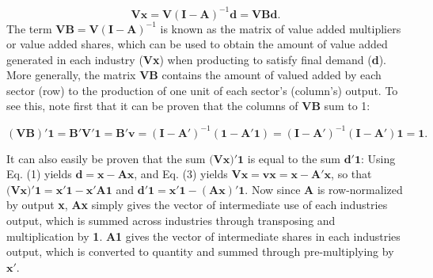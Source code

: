 \documentclass[a4paper]{article}
\begin{document}
\begin{equation} \label{eq:VB}
\textbf{V}\textbf{x} = \textbf{V}(\textbf{I}-\textbf{A})^{-1} \textbf{d} = \textbf{VBd}.
\end{equation}
The term $\textbf{VB} = \textbf{V}(\textbf{I}-\textbf{A})^{-1}$ is known as the matrix of value added multipliers or value added shares, which can be used to obtain the amount of value added generated in each industry (\textbf{Vx}) when producting to satisfy final demand (\textbf{d}). More generally, the matrix $\textbf{VB}$ contains the amount of valued added by each sector (row) to the production of one unit of each sector's (column's) output.  To see this, note first that it can be proven that the columns of \textbf{VB} sum to 1:

\begin{equation} \label{eq:VBproof}
(\textbf{VB})'\textbf{1} = \textbf{B}'\textbf{V}'\textbf{1} =  \textbf{B}'\textbf{v}  = (\textbf{I}-\textbf{A}')^{-1}  (\textbf{1}-\textbf{A}'\textbf{1}) = (\textbf{I}-\textbf{A}')^{-1}  (\textbf{I}-\textbf{A}')\textbf{1} = \textbf{1}.
\end{equation}



It can also easily be proven that the sum $\textbf{(Vx)}'\textbf{1}$ is equal to the sum $\textbf{d}'\textbf{1}$: Using Eq. (1) yields $\textbf{d} = \textbf{x} - \textbf{Ax}$, and Eq. (3) yields $\textbf{Vx} = \textbf{vx} = \textbf{x} - \textbf{A}'\textbf{x}$, so that $\textbf{(Vx)}'\textbf{1} = \textbf{x}'\textbf{1} - \textbf{x}'\textbf{A}\textbf{1}$ and $\textbf{d}'\textbf{1} = \textbf{x}'\textbf{1} - (\textbf{A}\textbf{x})'\textbf{1}$. Now since \textbf{A} is row-normalized by output \textbf{x}, \textbf{Ax} simply gives the vector of intermediate use of each industries output, which is summed across industries through transposing and multiplication by \textbf{1}.  \textbf{A}\textbf{1} gives the vector of intermediate shares in each industries output, which is converted to quantity and summed through pre-multiplying by $\textbf{x}'$. \newline
\end{document}
